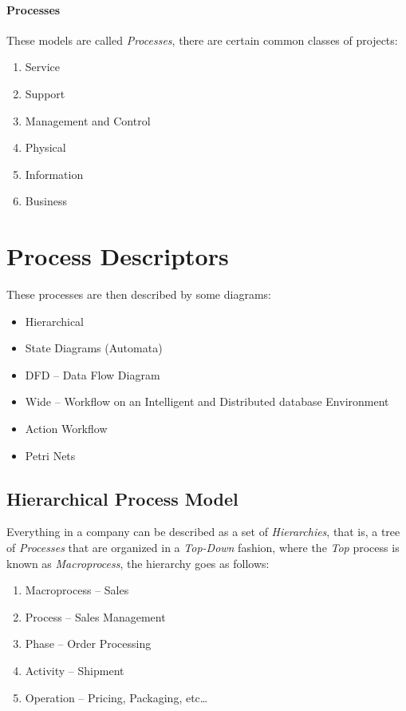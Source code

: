 \documentclass[openright, twoside, twocolumn]{report}
\begin{document}
    \paragraph{Processes} 
    These models are called \emph{Processes}, there are certain common classes of projects:

    \begin{enumerate}
      \item Service
      \item Support 
      \item Management and Control
      \item Physical
      \item Information 
      \item Business
    \end{enumerate}

    \section{Process Descriptors} 
    
    These processes are then described by some diagrams:

    \begin{itemize}
      \item Hierarchical
      \item State Diagrams (Automata)
      \item DFD -- Data Flow Diagram
      \item Wide -- Workflow on an Intelligent and Distributed database Environment
      \item Action Workflow
      \item Petri Nets
    \end{itemize}
    
    \subsection{Hierarchical Process Model}

    Everything in a company can be described as a set of \emph{Hierarchies}, that is, a tree of
    \emph{Processes} that are organized in a \emph{Top-Down} fashion, where the \emph{Top}
    process is known as \emph{Macroprocess}, the hierarchy goes as follows:

    \begin{enumerate}
      \item Macroprocess -- Sales
      \item Process -- Sales Management
      \item Phase -- Order Processing
      \item Activity -- Shipment
      \item Operation -- Pricing, Packaging, etc\dots
    \end{enumerate}
    
\end{document}
